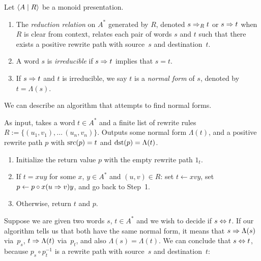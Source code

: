 \documentclass[../generics]{subfiles}
\begin{document}
\begin{definition}
Let $\langle A \mid R\rangle$ be a monoid presentation.
\begin{enumerate}
\item The \emph{reduction relation} on $A^*$ generated by $R$, denoted \index{$\Red$}$s\Rightarrow_R t$ or $s\Rightarrow t$ when $R$ is clear from context, relates each pair of words $s$ and $t$ such that there exists a positive rewrite path with source~$s$ and destination~$t$.

\item A word $s$ is \emph{irreducible} if $s\Rightarrow t$ implies that $s=t$.

\item If $s\Rightarrow t$ and $t$ is irreducible, we say $t$ is a \emph{normal form} of $s$, denoted by $t = \Lambda(s)$.
\end{enumerate}
\end{definition}

We can describe an algorithm that attempts to find normal forms.

\begin{algorithm}\label{alg:normal form}
As input, takes a word $t\in A^*$ and a finite list of rewrite rules $R:=\{(u_1,v_1),\ldots\,(u_n,v_n)\}$. Outputs some normal form $\Lambda(t)$, and a positive rewrite path $p$ with $\operatorname{src}(p)=t$ and $\operatorname{dst}(p)=\Lambda(t)$.
\begin{enumerate}
\item Initialize the return value $p$ with the empty rewrite path $1_t$.
\item If $t=xuy$ for some $x$, $y\in A^*$ and $(u,v)\in R$: set $t\leftarrow xvy$, set $p\leftarrow p \circ x(u\Rightarrow v)y$, and go back to Step~1.
\item Otherwise, return $t$ and $p$.
\end{enumerate}
\end{algorithm}

Suppose we are given two words $s$, $t\in A^*$ and we wish to decide if $s\Leftrightarrow t$. If our algorithm tells us that both have the same normal form, it means that $s\Rightarrow \Lambda(s)$ via~$p_s$, $t\Rightarrow \Lambda(t)$ via~$p_t$, and also $\Lambda(s)=\Lambda(t)$. We can conclude that $s\Leftrightarrow t$, because $p_s \circ p_t^{-1}$ is a rewrite path with source~$s$ and destination~$t$:
\end{document}
